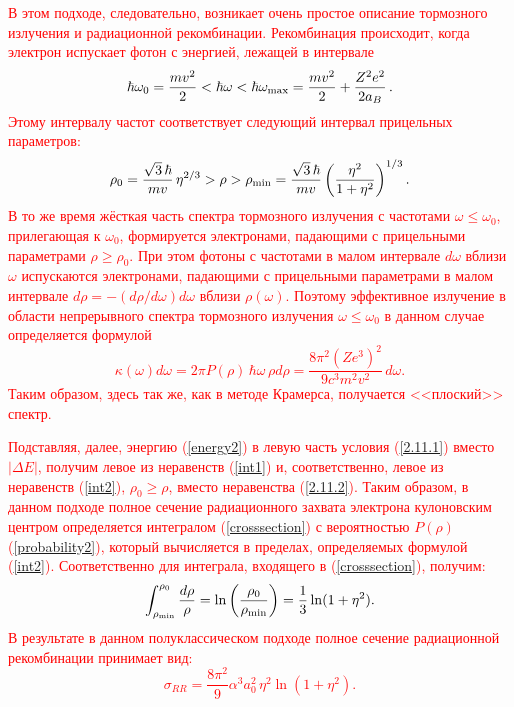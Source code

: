 \documentclass{SovJurn/JETPL}
\begin{document}
\textcolor{Red}{В этом подходе, следовательно, возникает очень простое описание тормозного излучения и радиационной рекомбинации. Рекомбинация происходит, когда электрон испускает фотон с энергией, лежащей в интервале
\begin{equation}
\hbar\omega_0=\frac{mv^2}{2}<\hbar\omega<\hbar\omega_{\rm max}=\frac{mv^2}{2}+\frac{Z^2e^2}{2a_B}\,.
\label{int1}
\end{equation}
Этому интервалу частот соответствует следующий интервал прицельных параметров:
\begin{equation}
\rho_0=\frac{\sqrt{3}\,\hbar}{mv}\,\eta^{2/3}>\rho>\rho_{\rm min}=\frac{\sqrt{3}\,\hbar}{mv}\left(\frac{\eta^2}{1+\eta^2}\right)^{1/3}.
\label{int2}
\end{equation}
В то же время жёсткая часть спектра тормозного излучения с частотами $\omega\le\omega_0$, прилегающая к $\omega_0$, формируется электронами, падающими с прицельными параметрами $\rho\ge\rho_0$. При этом фотоны с частотами в малом интервале $d\omega$ вблизи $\omega$ испускаются электронами, падающими с прицельными параметрами в малом интервале $d\rho=-(d\rho/d\omega)d\omega$ вблизи $\rho(\omega)$. Поэтому эффективное излучение в области непрерывного спектра тормозного излучения $\omega\le\omega_0$ в данном случае определяется формулой
\begin{equation}
\kappa(\omega)d\omega=2\pi P(\rho)\,\hbar\omega\, \rho d\rho=
\frac{8\pi^2(Ze^3)^2}{9c^3m^2v^2}\,d\omega.
\label{effrad2}
\end{equation}
Таким образом, здесь так же, как в методе Крамерса, получается <<плоский>> спектр.}

\textcolor{Red}{Подставляя, далее, энергию (\ref{energy2}) в левую часть условия (\ref{2.11.1}) вместо $|\Delta E|$, получим левое из неравенств (\ref{int1}) и, соответственно, левое из неравенств (\ref{int2}), $\rho_0\ge \rho$, вместо неравенства (\ref{2.11.2}). Таким образом, в данном подходе полное сечение радиационного захвата электрона кулоновским центром определяется интегралом (\ref{crosssection}) с вероятностью $P(\rho)$ (\ref{probability2}), который вычисляется в пределах, определяемых формулой (\ref{int2}). Соответственно для интеграла, входящего в (\ref{crosssection}), получим:
\begin{equation}
\int_{\rho_{\rm min}}^{\rho_0}\frac{d\rho}{\rho}=
\ln\left(\frac{\rho_0}{\rho_{\rm min}}\right)=
\frac{1}{3}\ln (1+\eta^2).
\label{integral}
\end{equation}
В результате в данном полуклассическом подходе полное сечение радиационной рекомбинации принимает вид:
\begin{equation}
\sigma_{RR}=\frac{8\pi^2}{9}\alpha^3a_0^2\, \eta^2\ln (1+\eta^2).
\label{final_sigma}
\end{equation}
}
\end{document}
